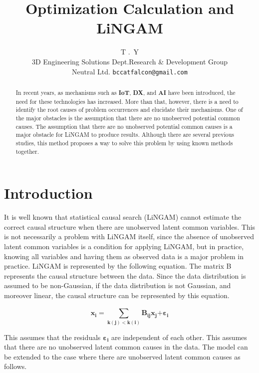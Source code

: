 \documentclass[pdftex]{article}
\title{Optimization Calculation and LiNGAM}
\author{ {\hspace{1mm}T .~Y}\\
	3D Engineering Solutions Dept.Research \& Development Group\\
	Neutral Ltd.
	\texttt{bccatfalcon@gmail.com} \\
}
\begin{document}
\maketitle

\begin{abstract}
In recent years, as mechanisms such as \textbf{IoT}, \textbf{DX}, and \textbf{AI} have been introduced, the need for these technologies has increased.
More than that, however, there is a need to identify the root causes of problem occurrences and elucidate their mechanisms. One of the major obstacles is the assumption that there are no unobserved potential common causes.
The assumption that there are no unobserved potential common causes is a major obstacle for LiNGAM \cite{shimizu2006linear} to produce results. Although there are several previous studies, this method proposes a way to solve this problem by using known methods together.

\end{abstract}




\section{Introduction}
 It is well known that statistical causal search (LiNGAM) cannot estimate the correct causal structure when there are unobserved latent common variables. This is not necessarily a problem with LiNGAM itself, since the absence of unobserved latent common variables is a condition for applying LiNGAM, but in practice, knowing all variables and having them as observed data is a major problem in practice.
LiNGAM is represented by the following equation. The matrix B represents the causal structure between the data. Since the data distribution is assumed to be non-Gaussian, if the data distribution is not Gaussian, and moreover linear, the causal structure can be represented by this equation.

\begin{equation}
\mathbf{x}_{\mathbf{i}}\mathbf{=}\sum_{\mathbf{k}\left( \mathbf{j} \right)\mathbf{< k(i)}}^{}{\mathbf{B}_{\mathbf{\text{ij}}}\mathbf{x}_{\mathbf{j}}}\mathbf{+}\mathbf{\varepsilon}_{\mathbf{i}}
\end{equation}

This assumes that the residuals  $\mathbf{\varepsilon}_{\mathbf{i}}$ are independent of each other.
This assumes that there are no unobserved latent common causes in the data. The model can be extended to the case where there are unobserved latent common causes as follows.
\end{document}
